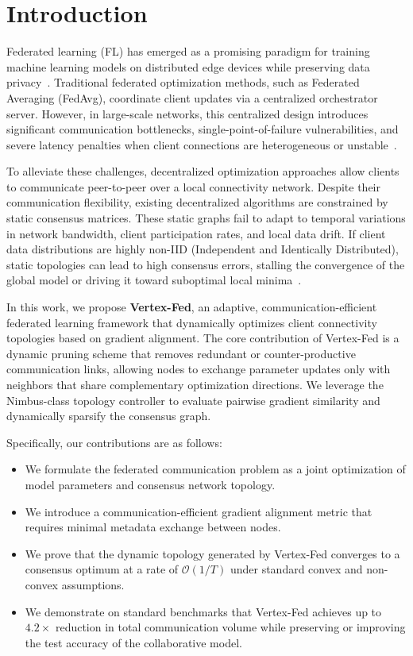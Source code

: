 \section{Introduction}
\label{sec:intro}
Federated learning (FL) has emerged as a promising paradigm for training machine learning models on distributed edge devices while preserving data privacy~\cite{Vance2024}. Traditional federated optimization methods, such as Federated Averaging (FedAvg), coordinate client updates via a centralized orchestrator server. However, in large-scale networks, this centralized design introduces significant communication bottlenecks, single-point-of-failure vulnerabilities, and severe latency penalties when client connections are heterogeneous or unstable~\cite{Chen2025}.

To alleviate these challenges, decentralized optimization approaches allow clients to communicate peer-to-peer over a local connectivity network. Despite their communication flexibility, existing decentralized algorithms are constrained by static consensus matrices. These static graphs fail to adapt to temporal variations in network bandwidth, client participation rates, and local data drift. If client data distributions are highly non-IID (Independent and Identically Distributed), static topologies can lead to high consensus errors, stalling the convergence of the global model or driving it toward suboptimal local minima~\cite{ApexConsensus2025}.

In this work, we propose \textbf{Vertex-Fed}, an adaptive, communication-efficient federated learning framework that dynamically optimizes client connectivity topologies based on gradient alignment. The core contribution of Vertex-Fed is a dynamic pruning scheme that removes redundant or counter-productive communication links, allowing nodes to exchange parameter updates only with neighbors that share complementary optimization directions. We leverage the Nimbus-class topology controller to evaluate pairwise gradient similarity and dynamically sparsify the consensus graph. 

Specifically, our contributions are as follows:
\begin{itemize}
    \item We formulate the federated communication problem as a joint optimization of model parameters and consensus network topology.
    \item We introduce a communication-efficient gradient alignment metric that requires minimal metadata exchange between nodes.
    \item We prove that the dynamic topology generated by Vertex-Fed converges to a consensus optimum at a rate of $\mathcal{O}(1/T)$ under standard convex and non-convex assumptions.
    \item We demonstrate on standard benchmarks that Vertex-Fed achieves up to $4.2\times$ reduction in total communication volume while preserving or improving the test accuracy of the collaborative model.
\end{itemize}
